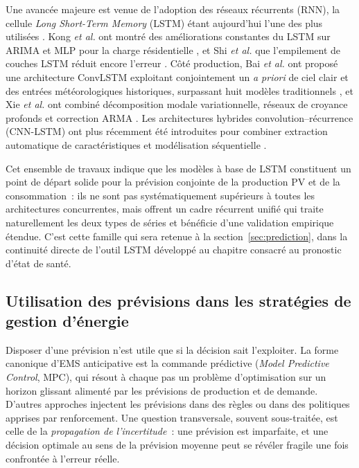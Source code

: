 Une avancée majeure est venue de l'adoption des réseaux récurrents (RNN), la cellule \textit{Long Short-Term Memory} (LSTM) étant aujourd'hui l'une des plus utilisées \cite{hochreiter_long_1997}. Kong \textit{et al.} ont montré des améliorations constantes du LSTM sur ARIMA et MLP pour la charge résidentielle \cite{kong_short-term_2019}, et Shi \textit{et al.} que l'empilement de couches LSTM réduit encore l'erreur \cite{shi_deep_2018}. Côté production, Bai \textit{et al.} ont proposé une architecture ConvLSTM exploitant conjointement un \textit{a priori} de ciel clair et des entrées météorologiques historiques, surpassant huit modèles traditionnels \cite{bai_deep_2022}, et Xie \textit{et al.} ont combiné décomposition modale variationnelle, réseaux de croyance profonds et correction ARMA \cite{xie_hybrid_2018}. Les architectures hybrides convolution--récurrence (CNN-LSTM) ont plus récemment été introduites pour combiner extraction automatique de caractéristiques et modélisation séquentielle \cite{rafi_short-term_2021, hasan_state---art_2025}.

Cet ensemble de travaux indique que les modèles à base de LSTM constituent un point de départ solide pour la prévision conjointe de la production PV et de la consommation~: ils ne sont pas systématiquement supérieurs à toutes les architectures concurrentes, mais offrent un cadre récurrent unifié qui traite naturellement les deux types de séries et bénéficie d'une validation empirique étendue. C'est cette famille qui sera retenue à la section~\ref{sec:prediction}, dans la continuité directe de l'outil LSTM développé au chapitre consacré au pronostic d'état de santé.

\subsection{Utilisation des prévisions dans les stratégies de gestion d'énergie}
\label{subsec:predictive_ems_sota}

Disposer d'une prévision n'est utile que si la décision sait l'exploiter. La forme canonique d'EMS anticipative est la commande prédictive (\textit{Model Predictive Control}, MPC), qui résout à chaque pas un problème d'optimisation sur un horizon glissant alimenté par les prévisions de production et de demande. D'autres approches injectent les prévisions dans des règles ou dans des politiques apprises par renforcement. Une question transversale, souvent sous-traitée, est celle de la \emph{propagation de l'incertitude}~: une prévision est imparfaite, et une décision optimale au sens de la prévision moyenne peut se révéler fragile une fois confrontée à l'erreur réelle.

